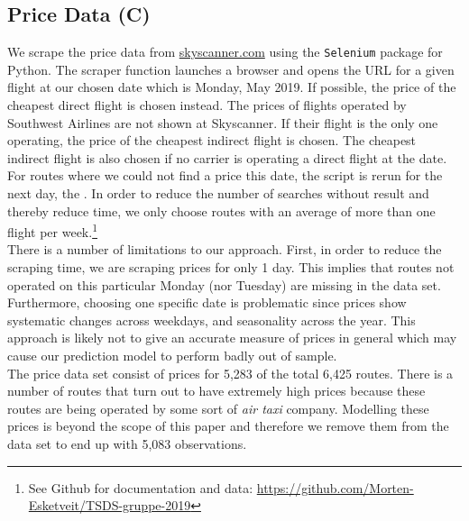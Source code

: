 \subsection{Price Data (C)}
We scrape the price data from \href{http://skyscanner.com}{skyscanner.com} using the \texttt{Selenium} package for Python. The scraper function launches a browser and opens the URL for a given flight at our chosen date which is Monday, May  2019. If possible, the price of the cheapest direct flight is chosen instead. The prices of flights operated by Southwest Airlines are not shown at Skyscanner. If their flight is the only one operating, the price of the cheapest indirect flight is chosen. The cheapest indirect flight is also chosen if no carrier is operating a direct flight at the date. For routes where we could not find a price this date, the script is rerun for the next day, the . In order to reduce the number of searches without result and thereby reduce time, we only choose routes with an average of more than one flight per week.\footnote{See Github for documentation and data: \url{https://github.com/Morten-Esketveit/TSDS-gruppe-2019}}
\medskip\\
There is a number of limitations to our approach. First, in order to reduce the scraping time, we are scraping prices for only 1 day. This implies that routes not operated on this particular Monday (nor Tuesday) are missing in the data set. Furthermore, choosing one specific date is problematic since prices show systematic changes across weekdays, and seasonality across the year. This approach is likely not to give an accurate measure of prices in general which may cause our prediction model to perform badly out of sample.
\medskip\\
The price data set consist of prices for 5,283 of the total 6,425 routes. There is a number of routes that turn out to have extremely high prices because these routes are being operated by some sort of \textit{air taxi} company. Modelling these prices is beyond the scope of this paper and therefore we remove them from the data set to end up with 5,083 observations.